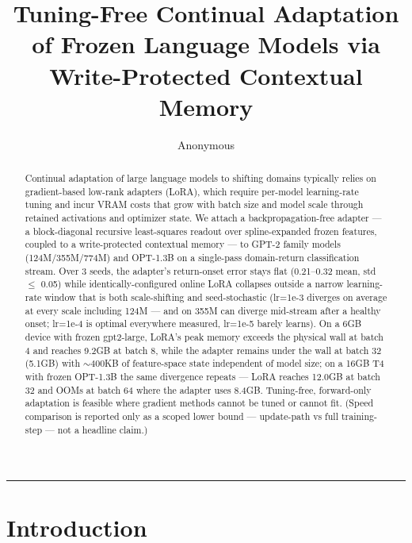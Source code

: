 \documentclass[11pt]{article}
\title{Tuning-Free Continual Adaptation of Frozen Language Models via
Write-Protected Contextual Memory}
\author{Anonymous}
\date{}
\begin{document}
\maketitle
\begin{center}\rule{0.5\linewidth}{0.5pt}\end{center}

\begin{abstract}
Continual adaptation of large language models to shifting domains typically relies on gradient-based low-rank adapters (LoRA), which require per-model learning-rate tuning and incur VRAM costs that grow with batch size and model scale through retained activations and optimizer state. We attach a backpropagation-free adapter --- a block-diagonal recursive least-squares readout over spline-expanded frozen features, coupled to a write-protected contextual memory --- to GPT-2 family models (124M/355M/774M) and OPT-1.3B on a single-pass domain-return classification stream. Over 3 seeds, the adapter's return-onset error stays flat (0.21--0.32 mean, std \(\leq\) 0.05) while identically-configured online LoRA collapses outside a narrow learning-rate window that is both scale-shifting and seed-stochastic (lr=1e-3 diverges on average at every scale including 124M --- and on 355M can diverge mid-stream after a healthy onset; lr=1e-4 is optimal everywhere measured, lr=1e-5 barely learns). On a 6GB device with frozen gpt2-large, LoRA's peak memory exceeds the physical wall at batch 4 and reaches 9.2GB at batch 8, while the adapter remains under the wall at batch 32 (5.1GB) with \(\sim 400\)KB of feature-space state independent of model size; on a 16GB T4 with frozen OPT-1.3B the same divergence repeats --- LoRA reaches 12.0GB at batch 32 and OOMs at batch 64 where the adapter uses 8.4GB. Tuning-free, forward-only adaptation is feasible where gradient methods cannot be tuned or cannot fit. (Speed comparison is reported only as a scoped lower bound --- update-path vs full training-step --- not a headline claim.)

\end{abstract}

\section{Introduction}\label{introduction}
\end{document}
